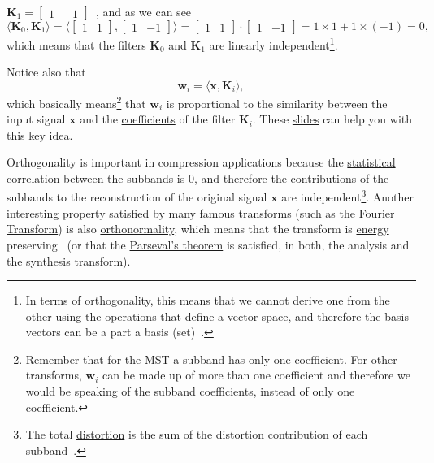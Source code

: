 ${\mathbf K}_1=\begin{bmatrix} 1 & -1\end{bmatrix}$~, and as we can
see
\begin{equation}
  \langle {\mathbf K}_0,{\mathbf K}_1 \rangle =
  \langle \begin{bmatrix}
    1 & 1
  \end{bmatrix}
  ,
  \begin{bmatrix}
    1 & -1
  \end{bmatrix}
  \rangle =
  \begin{bmatrix}
    1 & 1
  \end{bmatrix}
  \cdot
  \begin{bmatrix}
    1 & -1
  \end{bmatrix}
   = 1\times 1 + 1\times (-1) = 0,
\end{equation}
which means that the filters ${\mathbf K}_0$ and ${\mathbf K}_1$ are linearly
independent\footnote{In terms of orthogonality, this means that we
  cannot derive one from the other using the operations that define a
  vector space, and therefore the basis vectors can be a part a basis
  (set)~\cite{strang4linear}.}.

Notice also that
\begin{equation}
  {\mathbf w}_i = \langle {\mathbf x}, {\mathbf K}_i\rangle,
\end{equation}
which basically means\footnote{Remember that for the MST a subband has
  only one coefficient. For other transforms, ${\mathbf w}_i$ can be
  made up of more than one coefficient and therefore we would be
  speaking of the subband coefficients, instead of only one
  coefficient.} that ${\mathbf w}_i$ is proportional to the similarity
between the input signal ${\mathbf x}$ and the
\href{https://en.wikipedia.org/wiki/Finite_impulse_response}{coefficients} of
the filter ${\mathbf K}_i$. These
\href{https://cseweb.ucsd.edu/classes/fa17/cse166-a/lec13.pdf}{slides}
can help you with this key idea.

Orthogonality is important in compression applications because the
\href{https://en.wikipedia.org/wiki/Correlation_and_dependence}{statistical
  correlation} between the subbands is 0, and therefore the
contributions of the subbands to the reconstruction of the original
signal ${\mathbf x}$ are independent\footnote{The total
  \href{https://en.wikipedia.org/wiki/Distortion}{distortion} is the
  sum of the distortion contribution of each
  subband~\cite{sayood2017introduction}.}. Another interesting
property satisfied by many famous transforms (such as the
\href{https://en.wikipedia.org/wiki/Fourier_transform}{Fourier
  Transform}) is also
\href{https://en.wikipedia.org/wiki/Orthonormality}{orthonormality},
which means that the transform is
\href{https://en.wikipedia.org/wiki/Energy_(signal_processing)}{energy}
preserving~\cite{sayood2017introduction} (or that the
\href{https://en.wikipedia.org/wiki/Parseval%27s_theorem}{Parseval's
  theorem} is satisfied, in both, the analysis and the synthesis
transform).

